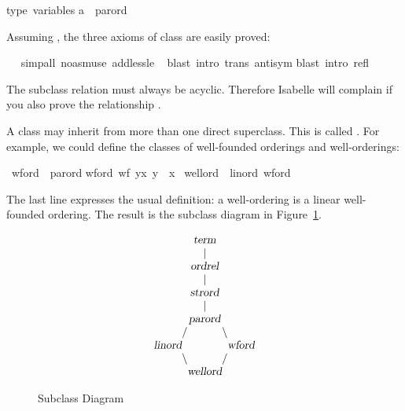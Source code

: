 \begin{isabellebody}
\begin{isamarkuptxt}
\begin{isabelle}
type\ variables{\isacharcolon}\isanewline
\isaindent{\ \ }{\isacharprime}a\ {\isacharcolon}{\isacharcolon}\ parord%
\end{isabelle}
Assuming , the three axioms of class 
are easily proved:%
\end{isamarkuptxt}%
\ \ \isamarkuptrue%
simp{\isacharunderscore}all\ {\isacharparenleft}no{\isacharunderscore}asm{\isacharunderscore}use{\isacharparenright}\ add{\isacharcolon}less{\isacharunderscore}le{\isacharparenright}\isanewline
\ \isamarkupfalse%
blast\ intro{\isacharcolon}\ trans\ antisym{\isacharparenright}\isanewline
\isamarkupfalse%
blast\ intro{\isacharcolon}\ refl{\isacharparenright}\isanewline
\isamarkupfalse%
\isamarkupfalse%
%
\begin{isamarkuptext}%
The subclass relation must always be acyclic. Therefore Isabelle will
complain if you also prove the relationship .%
\end{isamarkuptext}%
\isamarkuptrue%
%
\isamarkuptrue%
%
\begin{isamarkuptext}%
A class may inherit from more than one direct superclass. This is called
.  For example, we could define
the classes of well-founded orderings and well-orderings:%
\end{isamarkuptext}%
\isamarkuptrue%
\ wford\ {\isacharless}\ parord\isanewline
wford{\isacharcolon}\ {\isachardoublequote}wf\ {\isacharbraceleft}{\isacharparenleft}y{\isacharcomma}x{\isacharparenright}{\isachardot}\ y\ {\isacharless}{\isacharless}\ x{\isacharbraceright}{\isachardoublequote}\isanewline
\isanewline
\isamarkupfalse%
\ wellord\ {\isacharless}\ linord{\isacharcomma}\ wford\isamarkupfalse%
%
\begin{isamarkuptext}%
\noindent
The last line expresses the usual definition: a well-ordering is a linear
well-founded ordering. The result is the subclass diagram in
Figure~\ref{fig:subclass}.

\begin{figure}[htbp]
\[
\begin{array}{r@ {}r@ {}c@ {}l@ {}l}
& & \isa{term}\\
& & |\\
& & \isa{ordrel}\\
& & |\\
& & \isa{strord}\\
& & |\\
& & \isa{parord} \\
& / & & \backslash \\
\isa{linord} & & & & \isa{wford} \\
& \backslash & & / \\
& & \isa{wellord}
\end{array}
\]
\caption{Subclass Diagram}
\label{fig:subclass}
\end{figure}


\end{isamarkuptext}
\end{isabellebody}
